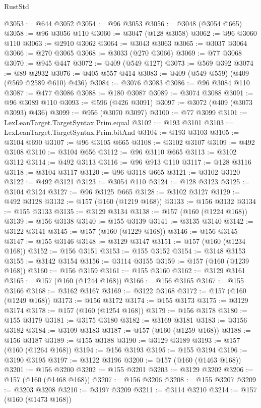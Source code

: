 \begin{lexlean}{RustStd}
\begin{coremodule}
@3053 := @644 @3052
@3054 := @96 @3053
@3056 := @3048 (@3054 @665)
@3058 := @96 @3056 @110
@3060 := @3047 (@128 @3058)
@3062 := @96 @3060 @110
@3063 := @2910 @3062
@3064 := @3043 @3063
@3065 := @3037 @3064
@3066 := @270 @3065
@3068 := @3033 (@270 @3066)
@3069 := @77 @3068
@3070 := @945 @447
@3072 := @409 (@549 @127)
@3073 := @569 @392
@3074 := @89 @2932
@3076 := @405 @557 @414
@3083 := @409 (@549 @559) (@409 (@569 @2589 @610) @436)
@3084 := @3076 @3083
@3086 := @96 @3084 @110
@3087 := @477 @3086
@3088 := @180 @3087
@3089 := @3074 @3088
@3091 := @96 @3089 @110
@3093 := @596 (@426 @3091)
@3097 := @3072 (@409 (@3073 @3093) @436)
@3099 := @956 (@3070 @3097)
@3100 := @77 @3099
@3101 := LexLeanTarget.TargetSyntax.Prim.equal
@3102 := @193 @3101
@3103 := LexLeanTarget.TargetSyntax.Prim.bitAnd
@3104 := @193 @3103
@3105 := @3104 @690
@3107 := @96 @3105 @665
@3108 := @3102 @3107
@3109 := @492 @3108
@3110 := @3104 @656
@3112 := @96 @3110 @665
@3113 := @3102 @3112
@3114 := @492 @3113
@3116 := @96 @913 @110
@3117 := @128 @3116
@3118 := @3104 @3117
@3120 := @96 @3118 @665
@3121 := @3102 @3120
@3122 := @492 @3121
@3123 := @3054 @110
@3124 := @128 @3123
@3125 := @3104 @3124
@3127 := @96 @3125 @665
@3128 := @3102 @3127
@3129 := @492 @3128
@3132 := @157 (@160 (@1219 @168))
@3133 := @156 @3132
@3134 := @155 @3133
@3135 := @3129 @3134
@3138 := @157 (@160 (@1224 @168))
@3139 := @156 @3138
@3140 := @155 @3139
@3141 := @3135 @3140
@3142 := @3122 @3141
@3145 := @157 (@160 (@1229 @168))
@3146 := @156 @3145
@3147 := @155 @3146
@3148 := @3129 @3147
@3151 := @157 (@160 (@1234 @168))
@3152 := @156 @3151
@3153 := @155 @3152
@3154 := @3148 @3153
@3155 := @3142 @3154
@3156 := @3114 @3155
@3159 := @157 (@160 (@1239 @168))
@3160 := @156 @3159
@3161 := @155 @3160
@3162 := @3129 @3161
@3165 := @157 (@160 (@1244 @168))
@3166 := @156 @3165
@3167 := @155 @3166
@3168 := @3162 @3167
@3169 := @3122 @3168
@3172 := @157 (@160 (@1249 @168))
@3173 := @156 @3172
@3174 := @155 @3173
@3175 := @3129 @3174
@3178 := @157 (@160 (@1254 @168))
@3179 := @156 @3178
@3180 := @155 @3179
@3181 := @3175 @3180
@3182 := @3169 @3181
@3183 := @3156 @3182
@3184 := @3109 @3183
@3187 := @157 (@160 (@1259 @168))
@3188 := @156 @3187
@3189 := @155 @3188
@3190 := @3129 @3189
@3193 := @157 (@160 (@1264 @168))
@3194 := @156 @3193
@3195 := @155 @3194
@3196 := @3190 @3195
@3197 := @3122 @3196
@3200 := @157 (@160 (@1463 @168))
@3201 := @156 @3200
@3202 := @155 @3201
@3203 := @3129 @3202
@3206 := @157 (@160 (@1468 @168))
@3207 := @156 @3206
@3208 := @155 @3207
@3209 := @3203 @3208
@3210 := @3197 @3209
@3211 := @3114 @3210
@3214 := @157 (@160 (@1473 @168))

\end{coremodule}
\end{lexlean}
